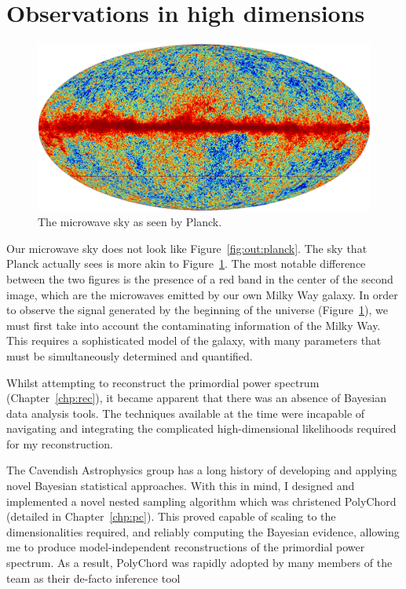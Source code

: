\section{Observations in high dimensions}
\begin{figure}[tp]
  \includegraphics[width=\textwidth]{chapters/outline/figures/planck_galaxy}
  \caption{The microwave sky as seen by Planck.}\label{fig:out:planck_galaxy}
\end{figure}
Our microwave sky does not look like Figure~\ref{fig:out:planck}. The sky that Planck actually sees is more akin to Figure~\ref{fig:out:planck_galaxy}. The most notable difference between the two figures is the presence of a red band in the center of the second image, which are the microwaves emitted by our own Milky Way galaxy. In order to observe the signal generated by the beginning of the universe (Figure~\ref{fig:out:planck_galaxy}), we must first take into account the contaminating information of the Milky Way. This requires a sophisticated model of the galaxy, with many parameters that must be simultaneously determined and quantified. 

Whilst attempting to reconstruct the primordial power spectrum (Chapter~\ref{chp:rec}), it became apparent that there was an absence of Bayesian data analysis tools. The techniques available at the time were incapable of navigating and integrating the complicated high-dimensional likelihoods required for my reconstruction.

The Cavendish Astrophysics group has a long history of developing and applying novel Bayesian statistical approaches. With this in mind, I designed and implemented a novel nested sampling algorithm which was christened PolyChord (detailed in Chapter~\ref{chp:pc}). This proved capable of scaling to the dimensionalities required, and reliably computing  the Bayesian evidence, allowing me to produce model-independent reconstructions of the primordial power spectrum.
As a result, PolyChord was rapidly adopted by many members of the team as their de-facto inference tool

